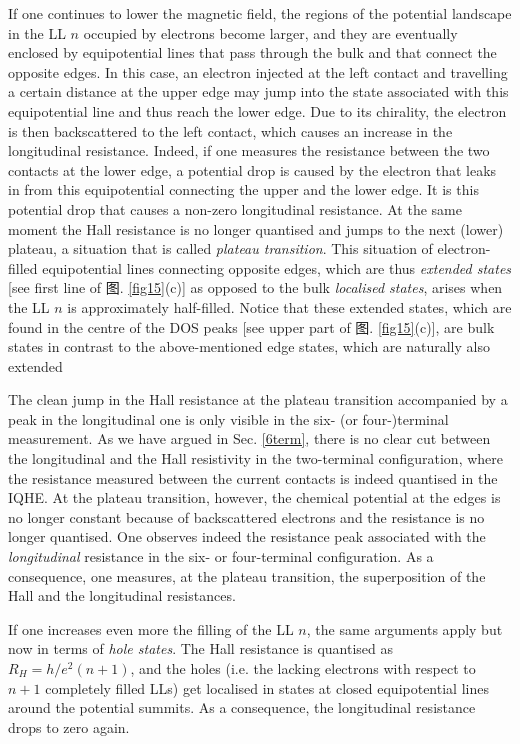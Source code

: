 \documentclass[10pt]{book}
\begin{document}
If one continues to lower the magnetic field, the regions of the potential landscape in the LL $n$
occupied by electrons become larger,
and they are eventually enclosed by equipotential lines that pass through the bulk and that
connect the opposite edges. In this case, an electron injected at 
the left contact and travelling a certain distance at the upper edge 
may jump into the state associated with this equipotential line and thus reach the lower edge. Due to its chirality, the electron
is then backscattered to the left contact, which causes an increase in the longitudinal resistance. Indeed, if one measures the
resistance between the two contacts at the lower edge, a potential drop is caused by the electron that leaks in from this 
equipotential connecting the upper and the lower edge. It is this potential drop that causes a non-zero longitudinal resistance.
At the same moment the Hall resistance is no longer quantised and jumps to the next (lower) plateau, a situation that is
called {\sl plateau transition}. This situation of electron-filled
equipotential lines connecting opposite edges, which are thus {\sl extended states} [see first line of 图. \ref{fig15}(c)]
as opposed to the bulk {\sl localised states}, arises when the LL $n$ is approximately half-filled. Notice that these extended
states, which are found in the centre of the DOS peaks [see upper part of 图. \ref{fig15}(c)],
are  bulk states in contrast to the above-mentioned  edge states, which are naturally also extended

The clean jump in the Hall resistance at the plateau transition accompanied by
a peak in the longitudinal one is only visible in the six- (or four-)terminal measurement. As we have argued in Sec. \ref{6term},
there is no clear cut between the longitudinal and the Hall resistivity in the two-terminal configuration, where the resistance
measured between the current contacts is indeed quantised in the IQHE. At the plateau transition, however, the chemical potential
at the edges is no longer constant because of backscattered electrons and the resistance is no longer quantised. One observes indeed
the resistance peak associated with the {\sl longitudinal} resistance in the six- or four-terminal configuration. As a consequence,
one measures, at the plateau transition, the superposition of the Hall and the longitudinal resistances.

If one increases even more
the filling of the LL $n$, the same arguments apply but now in terms of {\sl hole states}. The Hall resistance is quantised as
$R_H=h/e^2(n+1)$, and the holes (i.e. the lacking electrons with respect to $n+1$ completely filled LLs) get localised in states at
closed equipotential lines around the potential summits. As a consequence, the longitudinal resistance drops to zero again. 
\end{document}
